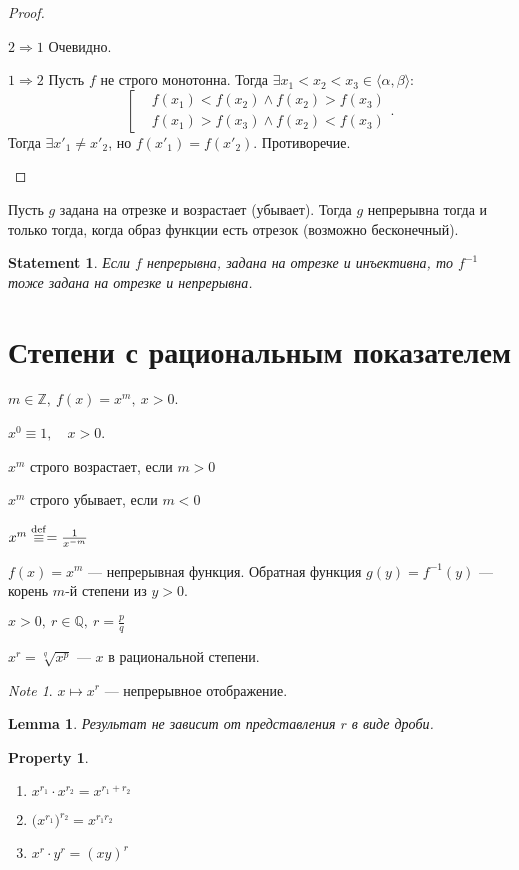 \documentclass[11pt]{book}
\newcommand{\Z}{\mathbb{Z}}
\newcommand{\Q}{\mathbb{Q}}
\theoremstyle{definition}
\theoremstyle{plain}
\theoremstyle{plain}
\newtheorem*{lm}{Lemma}
\newtheorem*{st}{Statement}
\newtheorem*{prop}{Property}
\theoremstyle{definition}
\theoremstyle{remark}
\newtheorem*{note}{Note}
\begin{document}
\begin{proof}
    $ $
    \begin{description}
	\item $ \boxed{ 2 \Longrightarrow 1}$ Очевидно.
	\item $ \boxed{1 \Longrightarrow 2}$  Пусть  $ f$ не строго монотонна. Тогда $ \exists x_1 <x_2<x_3 \in \langle \alpha, \beta \rangle$:
	    \[
	    \left[
	    \begin{aligned}
		& f(x_1) < f(x_2) \wedge f(x_2) > f(x_3)\\
		& f(x_1) > f(x_3) \wedge f(x_2) < f(x_3)
	    \end{aligned}
	    \right.
	.\]
	Тогда $ \exists x'_1 \ne  x'_2$, но $ f(x'_1) = f(x'_2)$. Противоречие. 
    \end{description}
\end{proof}
\begin{thm}
    Пусть $ g$ задана на отрезке и возрастает (убывает). Тогда  $ g$ непрерывна тогда и только тогда, когда образ функции есть отрезок (возможно бесконечный).
\end{thm}
\begin{st}
    Если  $ f$ непрерывна, задана на отрезке и инъективна, то $ f^{-1}$ тоже задана на отрезке и непрерывна.
\end{st}
\section{Степени с рациональным показателем}
$ m \in \Z, ~ f(x) = x^{m}, ~ x >0$.

$ x^{0} \equiv  1, \quad x >0$.

$ x^{m}$ строго возрастает, если $ m >0$

$ x^{m}$ строго убывает, если $ m <0$

$ x^{m} \mathrel{\stackrel{\rm def}\equiv }  = \frac{1}{x^{-m}}$

$ f(x) = x^{m}$ --- непрерывная функция.
Обратная функция $ g(y) = f^{-1}(y) $ --- корень $ m$-й степени из $ y>0$.
\begin{defn}
    $ x >0, ~ r \in \Q, ~ r = \frac{p}{q}$

    $ x^{r} = \sqrt[q]{x ^{p}}$ --- $ x$ в рациональной степени.
\end{defn}
\begin{note}
    $ x \mapsto x^{r}$ --- непрерывное отображение.
\end{note}
\begin{lm}
    Результат не зависит от представления $ r$ в виде дроби.
\end{lm}
\begin{prop}
    $ $
    \begin{enumerate}
        \item $ x^{r_1} \cdot x^{r_2} = x^{r_1+r_2}$
	\item $ \bigl(x^{r_1}\bigr)^{r_2}  = x^{r_1r_2}$ 
	\item $ x^{r} \cdot y^{r} = (xy)^{r}$
    \end{enumerate}
\end{prop}
\end{document}
